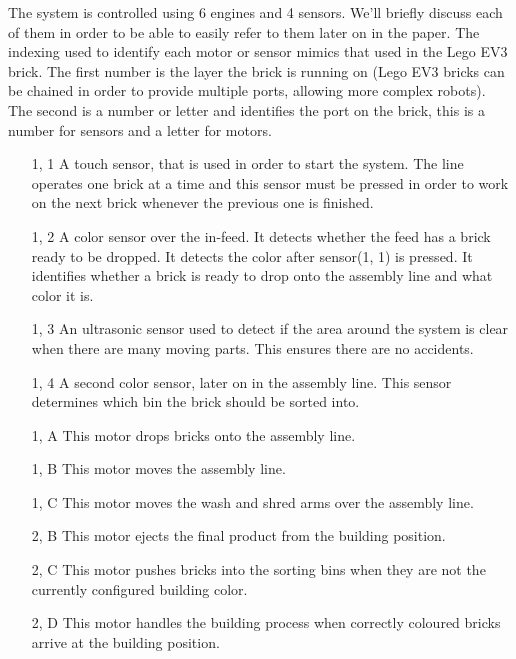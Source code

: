 \documentclass[conference]{IEEEtran}
\begin{document}
The system is controlled using 6 engines and 4 sensors. We'll briefly discuss each of them in order to be able to easily refer to them later on in the paper. The indexing used to identify each motor or sensor mimics that used in the Lego EV3 brick. The first number is the layer the brick is running on (Lego EV3 bricks can be chained in order to provide multiple ports, allowing more complex robots). The second is a number or letter and identifies the port on the brick, this is a number for sensors and a letter for motors. 
\begin{itemize}
\item[1, 1] A touch sensor, that is used in order to start the system. The line operates one brick at a time and this sensor must be pressed in order to work on the next brick whenever the previous one is finished.
\item[1, 2] A color sensor over the in-feed. It detects whether the feed has a brick ready to be dropped. It detects the color after sensor(1, 1) is pressed. It identifies whether a brick is ready to drop onto the assembly line and what color it is.
\item[1, 3] An ultrasonic sensor used to detect if the area around the system is clear when there are many moving parts. This ensures there are no accidents.
\item[1, 4] A second color sensor, later on in the assembly line. This sensor determines which bin the brick should be sorted into. 

\item[1, A] This motor drops bricks onto the assembly line.
\item[1, B] This motor moves the assembly line.
\item[1, C] This motor moves the wash and shred arms over the assembly line.
\item[2, B] This motor ejects the final product from the building position.
\item[2, C] This motor pushes bricks into the sorting bins when they are not the currently configured building color.
\item[2, D] This motor handles the building process when correctly coloured bricks arrive at the building position. 
\end{itemize}
\end{document}
